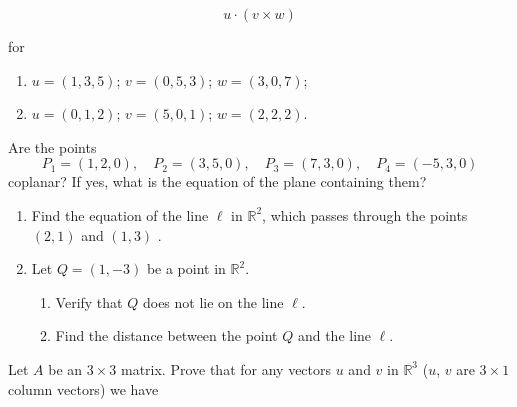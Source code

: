 \[u\cdot (v\times w)\]

for

\begin{enumerate}
\item $u=(1,3,5)$; $v=(0,5,3)$; $w=(3,0,7)$;

\item $u=(0,1,2)$; $v=(5,0,1)$; $w=(2,2,2).$
\end{enumerate}
\vfill\item Are the points 
$$P_1=(1,2,0), \quad P_2=(3,5,0),\quad P_3=(7,3,0), \quad P_4=(-5,3,0)
$$
coplanar? If yes, what is the equation of the plane containing them?

\vfill\item
\begin{enumerate}
\item Find the equation of the line $\ell$ in $\mathbb{R}^2$, which  passes through the 
points $(2,1)$ and $(1,3)$ .

\item  Let $Q = (1, -3)$  be a point in $\mathbb{R}^2$.
\begin{enumerate}
\item Verify that $Q$ does not lie on the line $\ell$.

\item Find the distance between the point $Q$ and the line $\ell$.
\end{enumerate}
\end{enumerate}\newpage
\vspace{0.25cm}\item Let $A$ be an $3\times 3$ matrix. Prove that for any vectors $u$ and $v$  in $\mathbb{R}^3$ ($u$, $v$ are $3\times 1$ column vectors) we have
